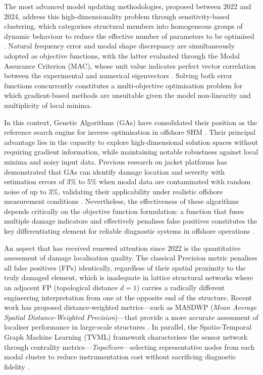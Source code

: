 \documentclass[a4paper,fleqn,nologo]{cas-dc}
\begin{document}
The most advanced model updating methodologies, proposed between 2022 and 2024, address this high-dimensionality problem through sensitivity-based clustering, which categorises structural members into homogeneous groups of dynamic behaviour to reduce the effective number of parameters to be optimised \citep{jiang2024model}. Natural frequency error and modal shape discrepancy are simultaneously adopted as objective functions, with the latter evaluated through the Modal Assurance Criterion (MAC), whose unit value indicates perfect vector correlation between the experimental and numerical eigenvectors \citep{jiang2024model}. Solving both error functions concurrently constitutes a multi-objective optimisation problem for which gradient-based methods are unsuitable given the model non-linearity and multiplicity of local minima.

In this context, Genetic Algorithms (GAs) have consolidated their position as the reference search engine for inverse optimisation in offshore SHM \citep{goldberg1989genetic}. Their principal advantage lies in the capacity to explore high-dimensional solution spaces without requiring gradient information, while maintaining notable robustness against local minima and noisy input data. Previous research on jacket platforms has demonstrated that GAs can identify damage location and severity with estimation errors of 3\% to 5\% when modal data are contaminated with random noise of up to 3\%, validating their applicability under realistic offshore measurement conditions \citep{rahmani2013ga}. Nevertheless, the effectiveness of these algorithms depends critically on the objective function formulation: a function that fuses multiple damage indicators and effectively penalises false positives constitutes the key differentiating element for reliable diagnostic systems in offshore operations \citep{malekzadeh2013damage}.

An aspect that has received renewed attention since 2022 is the quantitative assessment of damage localisation quality. The classical Precision metric penalises all false positives (FPs) identically, regardless of their spatial proximity to the truly damaged element, which is inadequate in lattice structural networks where an adjacent FP (topological distance $d=1$) carries a radically different engineering interpretation from one at the opposite end of the structure. Recent work has proposed distance-weighted metrics---such as MASDWP (\textit{Mean Average Spatial Distance-Weighted Precision})---that provide a more accurate assessment of localiser performance in large-scale structures \citep{li2024reliability}. In parallel, the Spatio-Temporal Graph Machine Learning (TVML) framework characterises the sensor network through centrality metrics---\textit{TopoScore}---selecting representative nodes from each modal cluster to reduce instrumentation cost without sacrificing diagnostic fidelity \citep{ma2024tvml}.
\end{document}
